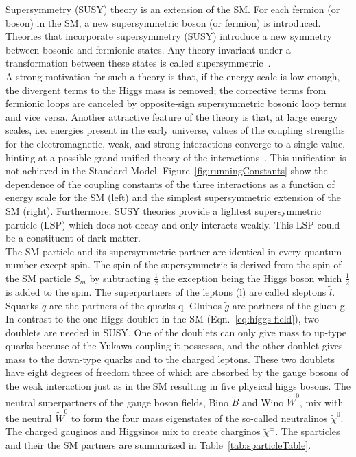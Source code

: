 Supersymmetry (SUSY) theory is an extension of the SM. For each fermion (or boson) in
the SM, a new supersymmetric boson (or fermion) is introduced. Theories that incorporate 
supersymmetry (SUSY) introduce a new symmetry between bosonic and fermionic states. 
Any theory invariant under a transformation between these states is called 
supersymmetric~\cite{ramond1999journeys}.\\
\indent A strong motivation for such a theory is that, if the energy scale is low enough, the 
divergent terms to the Higgs mass is removed; the corrective terms from fermionic loops are canceled by 
opposite-sign supersymmetric bosonic loop terms and vice versa. Another attractive feature
of the theory is that, at large energy scales, i.e. energies present in the early universe, 
values of the coupling strengths for the electromagnetic, weak, and strong interactions converge 
to a single value, hinting at a possible grand unified theory of the interactions~\cite{wess1992supersymmetry}. 
This unification is not achieved in the Standard Model. Figure~\ref{fig:runningConstants} show the 
dependence of the coupling constants of the three interactions as a function of energy scale 
for the SM (left) and the simplest supersymmetric extension of the SM (right). Furthermore,
SUSY theories provide a lightest supersymmetric particle (LSP) which does not decay and only 
interacts weakly. This LSP could be a constituent of dark matter.\\
\indent The SM particle and its supersymmetric partner are identical in every quantum number except spin. 
The spin of the supersymmetric is derived from the spin of the SM particle $S_{m}$ by 
subtracting $\frac{1}{2}$ the exception being the Higgs boson which $\frac{1}{2}$ is added
to the spin. The superpartners of the leptons (l) are called sleptons $\tilde{l}$. 
Squarks $\tilde{q}$ are the partners of the quarks q. Gluinos $\tilde{g}$ are partners
of the gluon g. In contrast to the one Higgs doublet in the SM (Eqn.~\ref{eq:higgs-field}), 
two doublets are needed in SUSY. One of the doublets can only give mass to up-type quarks because of
the Yukawa coupling it possesses, and the other doublet gives mass to the down-type 
quarks and to the charged leptons. These two doublets have eight degrees of
freedom three of which are absorbed by the gauge bosons of the weak interaction
just as in the SM resulting in five physical higgs bosons.
The neutral superpartners of the gauge boson fields, Bino $\widetilde{B}$ and Wino $\widetilde{W}^0$, mix
with the neutral $\widetilde{W}^0$ to form the four mass eigenstates of the so-called neutralinos 
$\widetilde{\chi}^0$. The charged gauginos and Higgsinos mix to create charginos $\widetilde{\chi}^{\pm}$.
The sparticles and their the SM partners are summarized in Table~\ref{tab:sparticleTable}.


